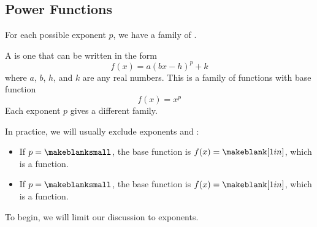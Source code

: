 \subsection{Power Functions} 
For each possible exponent $p$, we have a family of .
\begin{definition}
A  is one that can be written in the form
$$f(x)=a\left(bx-h\right)^p+k$$
where $a$, $b$, $h$, and $k$ are any real numbers. This is a family of functions with base function
$$f(x)=x^p$$
Each exponent $p$ gives a different family.
\end{definition}
\noi In practice, we will usually exclude exponents \makeblanksmall and \makeblanksmall:
\begin{itemize}
\item If $p=\makeblanksmall$, the base function is $f(x)=\makeblank[1in]$, which is a \makeblank[1in] function.
\item If $p=\makeblanksmall$, the base function is $f(x)=\makeblank[1in]$, which is a \makeblank[1in] function.
\end{itemize}
To begin, we will limit our discussion to \makeblank exponents.